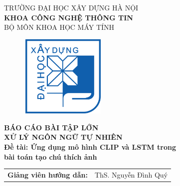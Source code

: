 \documentclass[main.tex]{subfiles}
\begin{document}
\begin{titlepage}

\begin{center}
\vspace{-8pt} {\fontsize{16pt}{0pt}\selectfont TRƯỜNG ĐẠI HỌC XÂY DỰNG HÀ NỘI} \\
\vspace{0.1cm}
\textbf{\fontsize{16pt}{0pt}\selectfont KHOA CÔNG NGHỆ THÔNG TIN}\\
\vspace{0.1cm}
{\fontsize{16pt}{0pt}\selectfont BỘ MÔN KHOA HỌC MÁY TÍNH}\\

\vspace{1cm}
 \begin{figure}[H]
     \centering
     \includegraphics[width=41.56mm, height=39.55mm]{Image/logodhxd.png}
 \end{figure}

\vspace{1cm}
\textbf{\fontsize{25pt}{0pt}\selectfont BÁO CÁO BÀI TẬP LỚN\\XỬ LÝ NGÔN NGỮ TỰ NHIÊN}\\[1cm]
\textbf{\fontsize{20pt}{0pt}\selectfont Đề tài: Ứng dụng mô hình CLIP và LSTM trong\\bài toán tạo chú thích ảnh}\\[1cm]
\vspace{0.3cm}

\begin{table}[H]
\centering
\begin{tabular}{l l}
{\textbf{\fontsize{16pt}{0pt}\selectfont Giảng viên hướng dẫn:}} & {\fontsize{16pt}{0pt}\selectfont ThS. Nguyễn Đình Quý}\vspace{10pt}\\


\end{tabular}
\end{table}
\end{center}
\end{titlepage}
\end{document}

